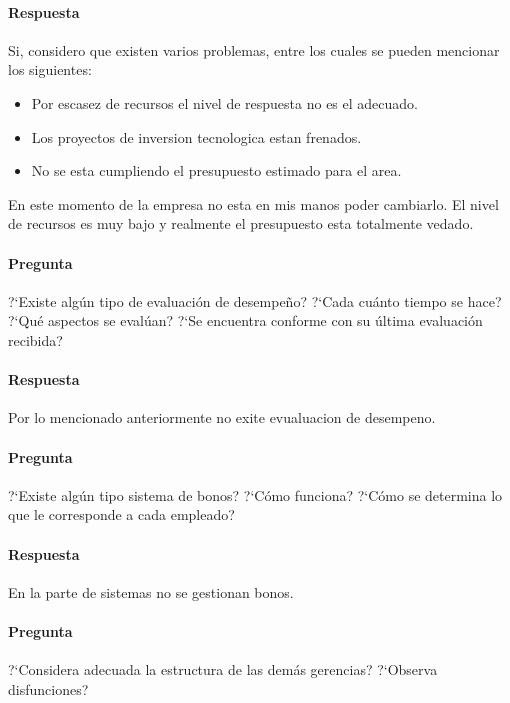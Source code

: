 \documentclass[12pt,a4paper,spanish]{article}
\begin{document}
	\paragraph{Respuesta}
Si, considero que existen varios problemas, entre los cuales se pueden mencionar los siguientes:
\begin{itemize}
\item Por escasez de recursos el nivel de respuesta no es el adecuado.
\item Los proyectos de inversion tecnologica estan frenados.
\item No se esta cumpliendo el presupuesto estimado para el area.
\end{itemize}
En este momento de la empresa no esta en mis manos poder cambiarlo.
El nivel de recursos es muy bajo y realmente el presupuesto esta totalmente vedado.

	\paragraph{Pregunta}
	 ?`Existe alg\'un tipo de evaluaci\'on de desempe\~{n}o?  ?`Cada cu\'anto tiempo se hace?  ?`Qu\'e aspectos se eval\'uan?  ?`Se encuentra conforme con su \'ultima evaluaci\'on recibida?
	\paragraph{Respuesta}
Por lo mencionado anteriormente no exite evualuacion de desempeno.
	\paragraph{Pregunta}
	 ?`Existe alg\'un tipo sistema de bonos?  ?`C\'omo funciona?  ?`C\'omo se determina lo que le corresponde a cada empleado?
	\paragraph{Respuesta}
En la parte de sistemas no se gestionan bonos.

	\paragraph{Pregunta}
	 ?`Considera adecuada la estructura de las dem\'as gerencias?  ?`Observa disfunciones?
\end{document}
